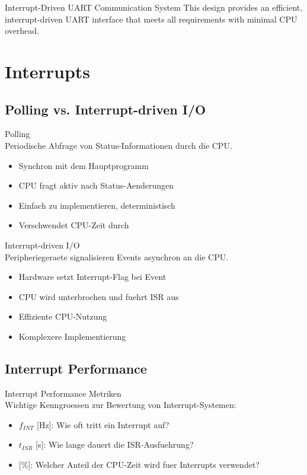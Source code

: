 \begin{example2}{Interrupt-Driven UART Communication System}
This design provides an efficient, interrupt-driven UART interface that meets all requirements with minimal CPU overhead.
\end{example2}

\section{Interrupts}

\subsection{Polling vs. Interrupt-driven I/O}

\begin{definition}{Polling}\\
    Periodische Abfrage von Status-Informationen durch die CPU.
    \begin{itemize}
        \item Synchron mit dem Hauptprogramm
        \item CPU fragt aktiv nach Status-Aenderungen
        \item Einfach zu implementieren, deterministisch
        \item Verschwendet CPU-Zeit durch 
    \end{itemize}
\end{definition}

\begin{definition}{Interrupt-driven I/O}\\
    Peripheriegeraete signalisieren Events asynchron an die CPU.
    \begin{itemize}
        \item Hardware setzt Interrupt-Flag bei Event
        \item CPU wird unterbrochen und fuehrt ISR aus
        \item Effiziente CPU-Nutzung
        \item Komplexere Implementierung
    \end{itemize}
\end{definition}

\subsection{Interrupt Performance}

\begin{concept}{Interrupt Performance Metriken}\\
    Wichtige Kenngroessen zur Bewertung von Interrupt-Systemen:
    \begin{itemize}
        \item {} $f_{INT}$ [Hz]: Wie oft tritt ein Interrupt auf?
        \item {} $t_{ISR}$ [s]: Wie lange dauert die ISR-Ausfuehrung?
        \item {} [\%]: Welcher Anteil der CPU-Zeit wird fuer Interrupts verwendet?
    \end{itemize}
\end{concept}

